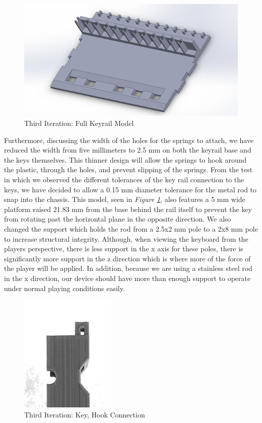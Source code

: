 \begin{figure}[h!]
  \centering
  \includegraphics[width=0.9\linewidth]{image/BaseModel3.png}
  \caption{Third Iteration: Full Keyrail Model}
  \label{fig:base_model3}
\end{figure}

Furthermore, discussing the width of the holes for the springs to attach, we have reduced the width from five millimeters to 2.5 mm on both the keyrail base and the keys themselves. This thinner design will allow the springs to hook around the plastic, through the holes, and prevent slipping of the springs. From the test in which we observed the different tolerances of the key rail connection to the keys, we have decided to allow a 0.15 mm diameter tolerance for the metal rod to snap into the chassis. This model, seen in \textit{Figure \ref{fig:base_model3}}, also features a 5 mm wide platform raised 21.83 mm from the base behind the rail itself to prevent the key from rotating past the horizontal plane in the opposite direction. We also changed the support which holds the rod from a 2.5x2 mm pole to a 2x8 mm pole to increase structural integrity. Although, when viewing the keyboard from the players perspective, there is less support in the x axis for these poles, there is significantly more support in the z direction which is where more of the force of the player will be applied. In addition, because we are using a stainless steel rod in the x direction, our device should have more than enough support to operate under normal playing conditions easily.

\begin{figure}[h!]
  \centering
  \includegraphics[width=0.25\linewidth]{image/Print5.png}
  \caption{Third Iteration: Key, Hook Connection}
  \label{fig:print5}
\end{figure}

